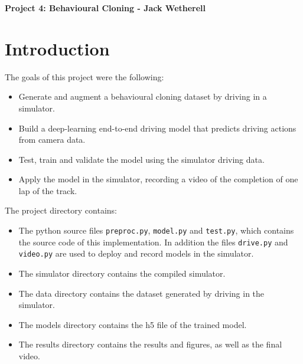 \documentclass[letterpaper,12pt]{article}
\begin{document}
\title{}
\author{}
\date{}


\begin{center}
\textbf{Project 4: Behavioural Cloning  - Jack Wetherell} \\
\end{center}


\section{Introduction}
The goals of this project were the following:
\begin{itemize}
\item Generate and augment a behavioural cloning dataset by driving in a simulator.
\item Build a deep-learning end-to-end driving model that predicts driving actions from camera data.
\item Test, train and validate the model using the simulator driving data.
\item Apply the model in the simulator, recording a video of the completion of one lap of the track.
\end{itemize}
The project directory contains:
\begin{itemize}
\item The python source files \texttt{preproc.py}, \texttt{model.py} and \texttt{test.py}, which contains the source code of this implementation. In addition the files \texttt{drive.py} and \texttt{video.py} are used to deploy and record models in the simulator. 
\item The simulator directory contains the compiled simulator. 
\item The data directory contains the dataset generated by driving in the simulator.
\item The models directory contains the h5 file of the trained model.
\item The results directory contains the results and figures, as well as the final video. 
\end{itemize}
\end{document}
